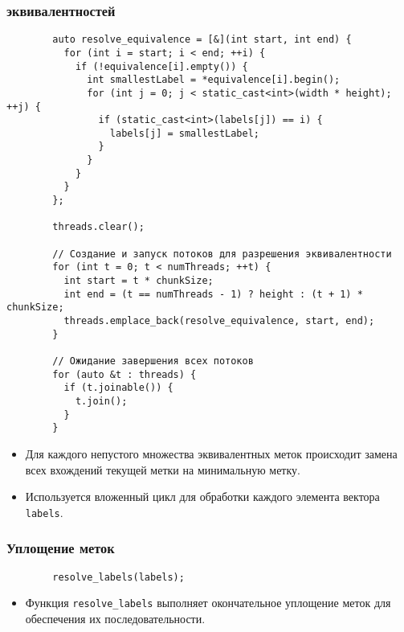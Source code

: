 \documentclass[a4paper, 14pt]{article}
\begin{document}
        \subsubsection*{ эквивалентностей}
        
        \begin{verbatim}
        auto resolve_equivalence = [&](int start, int end) {
          for (int i = start; i < end; ++i) {
            if (!equivalence[i].empty()) {
              int smallestLabel = *equivalence[i].begin();
              for (int j = 0; j < static_cast<int>(width * height); ++j) {
                if (static_cast<int>(labels[j]) == i) {
                  labels[j] = smallestLabel;
                }
              }
            }
          }
        };
        
        threads.clear();
        
        // Создание и запуск потоков для разрешения эквивалентности
        for (int t = 0; t < numThreads; ++t) {
          int start = t * chunkSize;
          int end = (t == numThreads - 1) ? height : (t + 1) * chunkSize;
          threads.emplace_back(resolve_equivalence, start, end);
        }
        
        // Ожидание завершения всех потоков
        for (auto &t : threads) {
          if (t.joinable()) {
            t.join();
          }
        }
        \end{verbatim}
        
        \begin{itemize}
          \item Для каждого непустого множества эквивалентных меток происходит замена всех вхождений текущей метки на минимальную метку.
          \item Используется вложенный цикл для обработки каждого элемента вектора \texttt{labels}.
        \end{itemize}
        
        \subsubsection*{\centering Уплощение меток}
        
        \begin{verbatim}
        resolve_labels(labels);
        \end{verbatim}
        
        \begin{itemize}
          \item Функция \texttt{resolve\_labels} выполняет окончательное уплощение меток для обеспечения их последовательности.
        \end{itemize}
\end{document}

